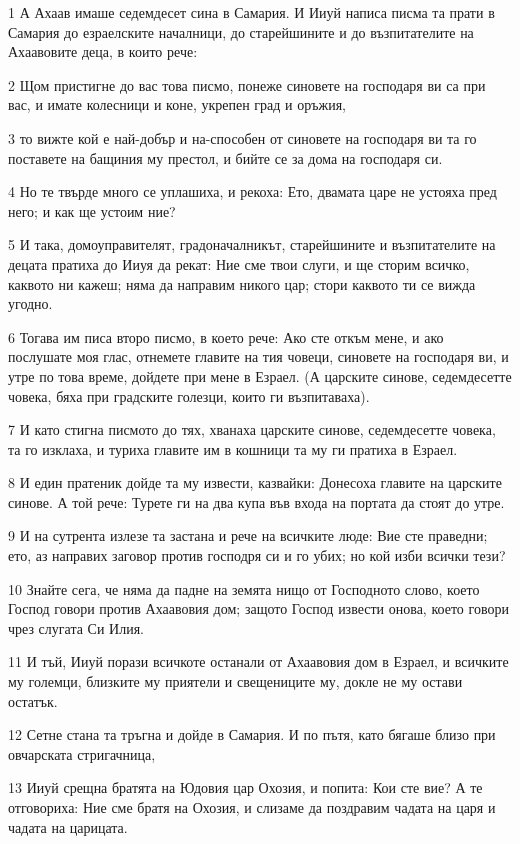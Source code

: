 \par 1 А Ахаав имаше седемдесет сина в Самария. И Ииуй написа писма та прати в Самария до езраелските началници, до старейшините и до възпитателите на Ахаавовите деца, в които рече:
\par 2 Щом пристигне до вас това писмо, понеже синовете на господаря ви са при вас, и имате колесници и коне, укрепен град и оръжия,
\par 3 то вижте кой е най-добър и на-способен от синовете на господаря ви та го поставете на бащиния му престол, и бийте се за дома на господаря си.
\par 4 Но те твърде много се уплашиха, и рекоха: Ето, двамата царе не устояха пред него; и как ще устоим ние?
\par 5 И така, домоуправителят, градоначалникът, старейшините и възпитателите на децата пратиха до Ииуя да рекат: Ние сме твои слуги, и ще сторим всичко, каквото ни кажеш; няма да направим никого цар; стори каквото ти се вижда угодно.
\par 6 Тогава им писа второ писмо, в което рече: Ако сте откъм мене, и ако послушате моя глас, отнемете главите на тия човеци, синовете на господаря ви, и утре по това време, дойдете при мене в Езраел. (А царските синове, седемдесетте човека, бяха при градските голезци, които ги възпитаваха).
\par 7 И като стигна писмото до тях, хванаха царските синове, седемдесетте човека, та го изклаха, и туриха главите им в кошници та му ги пратиха в Езраел.
\par 8 И един пратеник дойде та му извести, казвайки: Донесоха главите на царските синове. А той рече: Турете ги на два купа във входа на портата да стоят до утре.
\par 9 И на сутрента излезе та застана и рече на всичките люде: Вие сте праведни; ето, аз направих заговор против господря си и го убих; но кой изби всички тези?
\par 10 Знайте сега, че няма да падне на земята нищо от Господното слово, което Господ говори против Ахаавовия дом; защото Господ извести онова, което говори чрез слугата Си Илия.
\par 11 И тъй, Ииуй порази всичкоте останали от Ахаавовия дом в Езраел, и всичките му големци, близките му приятели и свещениците му, докле не му остави остатък.
\par 12 Сетне стана та тръгна и дойде в Самария. И по пътя, като бягаше близо при овчарската стригачница,
\par 13 Ииуй срещна братята на Юдовия цар Охозия, и попита: Кои сте вие? А те отговориха: Ние сме братя на Охозия, и слизаме да поздравим чадата на царя и чадата на царицата.

